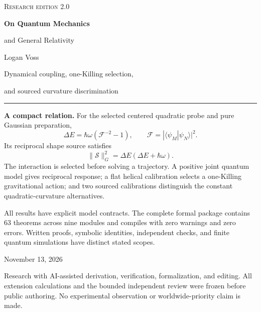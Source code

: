 \documentclass[11pt]{article}
\begin{document}
\hypersetup{pageanchor=false}
\begin{titlepage}
\vspace*{10mm}
{\color{accent}\small\scshape Research edition 2.0}\par\vspace{9mm}
{\color{ink}\Huge\bfseries On Quantum Mechanics\par and General Relativity}\par\vspace{8mm}
{\Large Logan Voss}\par\vspace{8mm}
{\large Dynamical coupling, one-Killing selection,\par and sourced curvature discrimination}\par\vspace{10mm}
\hrule\vspace{6mm}
\textbf{A compact relation.} For the selected centered quadratic probe and pure Gaussian preparation,
\[
\boxed{\Delta E=\hbar\omega(\mathcal F^{-2}-1),\qquad
\mathcal F=|\langle\psi_M|\psi_N\rangle|^2.}
\]
Its reciprocal shape source satisfies
\[
\boxed{\|\mathcal S\|_G^2=\Delta E(\Delta E+\hbar\omega).}
\]
The interaction is selected before solving a trajectory. A positive joint quantum model gives reciprocal response; a flat helical calibration selects a one-Killing gravitational action; and two sourced calibrations distinguish the constant quadratic-curvature alternatives.
\par\vspace{4mm}
All results have explicit model contracts. The complete formal package contains 63 theorems across nine modules and compiles with zero warnings and zero errors. Written proofs, symbolic identities, independent checks, and finite quantum simulations have distinct stated scopes.
\vfill
{\small November 13, 2026\par
Research with AI-assisted derivation, verification, formalization, and editing. All extension calculations and the bounded independent review were frozen before public authoring. No experimental observation or worldwide-priority claim is made.}\par
\end{titlepage}
\hypersetup{pageanchor=true}
\end{document}
